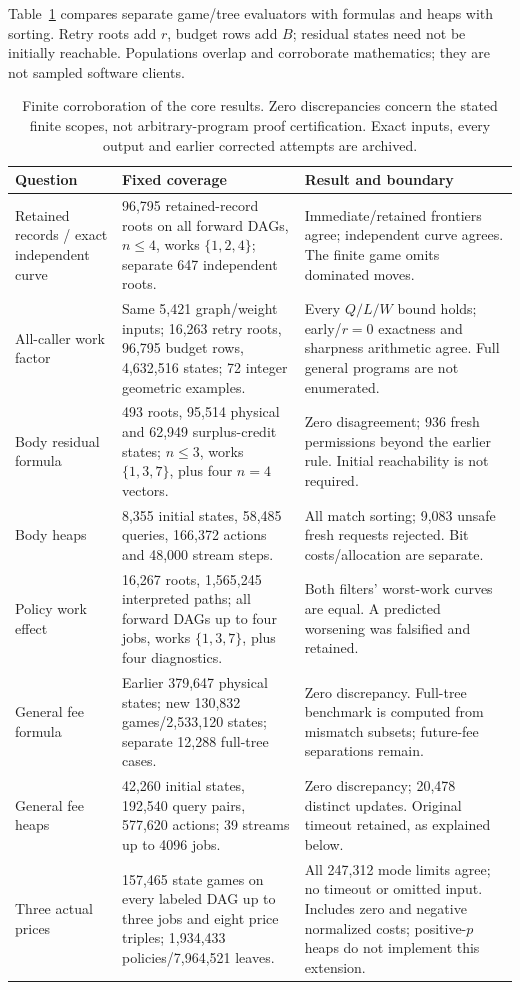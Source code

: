 \documentclass[acmsmall,screen,review,anonymous]{acmart}
\begin{document}
Table~\ref{tab:corroboration} compares separate game/tree evaluators with formulas and heaps with sorting. Retry roots add $r$, budget rows add $B$; residual states need not be initially reachable. Populations overlap and corroborate mathematics; they are not sampled software clients.

\begin{table}[t]
\caption{Finite corroboration of the core results. Zero discrepancies concern the stated finite scopes, not arbitrary-program proof certification. Exact inputs, every output and earlier corrected attempts are archived.}
\label{tab:corroboration}\centering\small
\begin{tabularx}{\linewidth}{@{}p{.20\linewidth}p{.39\linewidth}X@{}}
\toprule
Question & Fixed coverage & Result and boundary\\
\midrule
Retained records / exact independent curve & 96,795 retained-record roots on all forward DAGs, $n\le 4$, works $\{1, 2, 4\}$; separate 647 independent roots. & Immediate/retained frontiers agree; independent curve agrees. The finite game omits dominated moves.\\
\addlinespace
All-caller work factor & Same 5,421 graph/weight inputs; 16,263 retry roots, 96,795 budget rows, 4,632,516 states; 72 integer geometric examples. & Every $Q/L/W$ bound holds; early/$r=0$ exactness and sharpness arithmetic agree. Full general programs are not enumerated.\\
\addlinespace
Body residual formula & 493 roots, 95,514 physical and 62,949 surplus-credit states; $n\le 3$, works $\{1, 3, 7\}$, plus four $n=4$ vectors. & Zero disagreement; 936 fresh permissions beyond the earlier rule. Initial reachability is not required.\\
\addlinespace
Body heaps & 8,355 initial states, 58,485 queries, 166,372 actions and 48,000 stream steps. & All match sorting; 9,083 unsafe fresh requests rejected. Bit costs/allocation are separate.\\
\addlinespace
Policy work effect & 16,267 roots, 1,565,245 interpreted paths; all forward DAGs up to four jobs, works $\{1, 3, 7\}$, plus four diagnostics. & Both filters' worst-work curves are equal. A predicted worsening was falsified and retained.\\
\addlinespace
General fee formula & Earlier 379,647 physical states; new 130,832 games/2,533,120 states; separate 12,288 full-tree cases. & Zero discrepancy. Full-tree benchmark is computed from mismatch subsets; future-fee separations remain.\\
\addlinespace
General fee heaps & 42,260 initial states, 192,540 query pairs, 577,620 actions; 39 streams up to 4096 jobs. & Zero discrepancy; 20,478 distinct updates. Original timeout retained, as explained below.\\
\addlinespace
Three actual prices & 157,465 state games on every labeled DAG up to three jobs and eight price triples; 1,934,433 policies/7,964,521 leaves. & All 247,312 mode limits agree; no timeout or omitted input. Includes zero and negative normalized costs; positive-$p$ heaps do not implement this extension.\\
\bottomrule
\end{tabularx}
\end{table}
\end{document}

